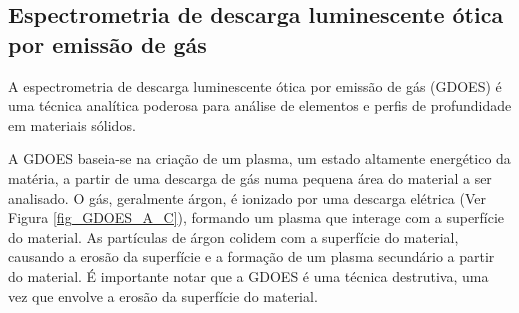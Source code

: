\subsection{Espectrometria de descarga luminescente ótica por emissão de gás}\label{ssec:soa_espectrometria}
A espectrometria de descarga luminescente ótica por emissão de gás (GDOES) é uma técnica analítica poderosa para análise de elementos e perfis de profundidade em materiais sólidos.
\par
A GDOES baseia-se na criação de um plasma, um estado altamente energético da matéria, a partir de uma descarga de gás numa pequena área do material a ser analisado. O gás, geralmente árgon, é ionizado por uma descarga elétrica (Ver Figura \ref{fig_GDOES_A_C}), formando um plasma que interage com a superfície do material. As partículas de árgon colidem com a superfície do material, causando a erosão da superfície e a formação de um plasma secundário a partir do material. É importante notar que a GDOES é uma técnica destrutiva, uma vez que envolve a erosão da superfície do material.
